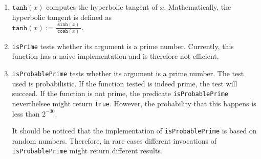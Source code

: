 \begin{enumerate}
\item $\texttt{tanh}(x)$ computes the hyperbolic tangent of $x$.  Mathematically, the
      hyperbolic tangent is defined as 
      \\[0.2cm]
      \hspace*{1.3cm}
      $\mathtt{tanh}(x) := \displaystyle \frac{\;\mathtt{sinh}(x)\;}{\mathtt{cosh}(x)}$.
\item \texttt{isPrime} tests whether its argument is a prime number.  Currently, 
      this function has a naive implementation and is therefore not efficient.
\item \texttt{isProbablePrime} tests whether its argument is a prime number.  The test
      used is probabilistic.  If the function tested is indeed  prime, the test 
      will succeed.  If the function is not prime, the predicate \texttt{isProbablePrime}
      neverthelsee might return \texttt{true}.  However, the probability that this happens
      is less than $2^{-30}$.

      It should be noticed that the implementation of \texttt{isProbablePrime} is
      based on random numbers.  Therefore, in rare cases different invocations of
      \texttt{isProbablePrime} might return different results.  
\end{enumerate}


